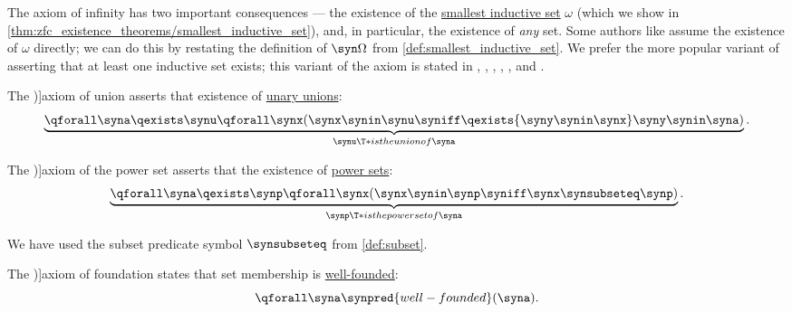\begin{definition}
\begin{thmenum}[series=def:zfc]
    The axiom of infinity has two important consequences --- the existence of the \hyperref[def:smallest_inductive_set]{smallest inductive set} \( \omega \) (which we show in \cref{thm:zfc_existence_theorems/smallest_inductive_set}), and, in particular, the existence of \emph{any} set. Some authors like \textcite[def. 6.1.6]{Hinman2005Logic} assume the existence of \( \omega \) directly; we can do this by restating the definition of \( \syn\Omega \) from \cref{def:smallest_inductive_set}. We prefer the more popular variant of asserting that at least one inductive set exists; this variant of the axiom is stated in
    \cite[12]{Jech2006SetTheory},
    \cite[17]{Kunen2013SetTheory},
    \cite[146]{Mendelson2015Logic},
    \cite[243]{Mimram2020ProgramEqualsProof},
    \cite[184]{Герасимов2014Вычислимость},
    \cite[159]{КолмогоровДрагалин2006ЛогикаДополнительныеГлавы} and
    \cite[\S 1.3.8]{КусраевКутателадзе2005БулевозначныйАнализ}.

     The \term[ru=аксиома объединения, en=axiom of union (\cite[190]{Kleene2002Logic})]{axiom of union} asserts that existence of \hyperref[def:set_union]{unary unions}:
    \begin{equation}\label{eq:def:zfc/union}
      \underbrace{\qforall \syna \qexists \synu \qforall \synx (\synx \synin \synu \syniff \qexists {\syny \synin \synx} \syny \synin \syna)}_{\synu \T*{is the union of} \syna}.
    \end{equation}

     The \term[ru=аксиома степени, en=axiom of the power set (\cite[190]{Kleene2002Logic})]{axiom of the power set} asserts that the existence of \hyperref[def:power_set]{power sets}:
    \begin{equation}\label{eq:def:zfc/power_set}
      \underbrace{\qforall \syna \qexists \synp \qforall \synx (\synx \synin \synp \syniff \synx \synsubseteq \synp)}_{\synp \T*{is the power set of} \syna}.
    \end{equation}

    We have used the subset predicate symbol \( {\synsubseteq} \) from \cref{def:subset}.

     The \term[ru=аксиома фундирования, en=axiom of foundation (\cite[245]{Mimram2020ProgramEqualsProof})]{axiom of foundation} states that set membership is \hyperref[def:well_founded_relation]{well-founded}:
    \begin{equation}\label{eq:def:zfc/foundation/expanded}
      \qforall \syna \synpred{well-founded}(\syna).
    \end{equation}


\end{thmenum}
\end{definition}
